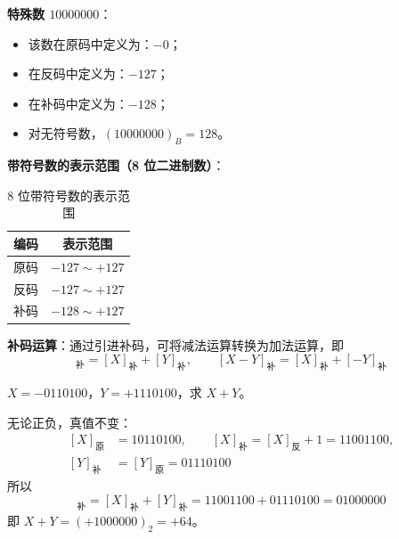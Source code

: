 \textbf{特殊数 $10000000$}：
\begin{itemize}
	\item 该数在原码中定义为：$-0$；
	\item 在反码中定义为：$-127$；
	\item 在补码中定义为：$-128$；
	\item 对无符号数，$(10000000)_B=128$。
\end{itemize}

\textbf{带符号数的表示范围（8 位二进制数）}：

\begin{table}[H]
\centering
\caption{8 位带符号数的表示范围}
\label{tab:补码:表示范围}
\begin{tabular}{lc}
	\toprule
	编码 & 表示范围 \\
	\midrule
	原码 & $-127\sim+127$ \\
	反码 & $-127\sim+127$ \\
	补码 & $-128\sim+127$ \\
	\bottomrule
\end{tabular}
\end{table}

\textbf{补码运算}：通过引进补码，可将减法运算转换为加法运算，即
\begin{equation}
	[X+Y]_{\text{补}}=[X]_{\text{补}}+[Y]_{\text{补}},\qquad
	[X-Y]_{\text{补}}=[X]_{\text{补}}+[-Y]_{\text{补}}
	\label{eq:补码:加减运算}
\end{equation}

\begin{longexample}[补码加法]
\label{ex:补码加法}
$X=-0110100$，$Y=+1110100$，求 $X+Y$。

\begin{solution}
	无论正负，真值不变：
	\begin{equation}
		\begin{aligned}
			[X]_{\text{原}}&=10110100,\qquad [X]_{\text{补}}=[X]_{\text{反}}+1=11001100,\\
			[Y]_{\text{补}}&=[Y]_{\text{原}}=01110100
		\end{aligned}
		\label{eq:补码:例补码}
	\end{equation}
	所以
	\begin{equation}
		[X+Y]_{\text{补}}=[X]_{\text{补}}+[Y]_{\text{补}}
		=11001100+01110100=01000000
		\label{eq:补码:例结果}
	\end{equation}
	即 $X+Y=(+1000000)_2=+64$。
\end{solution}
\end{longexample}

